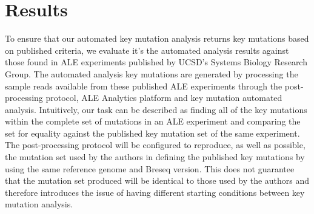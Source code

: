 \documentclass[12pt,final,masters,chapterheads]{ucsd}  %
\begin{document}

%
%

%
%
\section{Results}
%
%

To ensure that our automated key mutation analysis returns key mutations based on published criteria, we evaluate it's the automated analysis results against those found in ALE experiments published by UCSD's Systems Biology Research Group. The automated analysis key mutations are generated by processing the sample reads available from these published ALE experiments through the post-processing protocol, ALE Analytics platform and key mutation automated analysis. Intuitively, our task can be described as finding all of the key mutations within the complete set of mutations in an ALE experiment and comparing the set for equality against the published key mutation set of the same experiment. The post-processing protocol will be configured to reproduce, as well as possible, the mutation set used by the authors in defining the published key mutations by using the same reference genome and Breseq version. This does not guarantee that the mutation set produced will be identical to those used by the authors and therefore introduces the issue of having different starting conditions between key mutation analysis.
\end{document}
